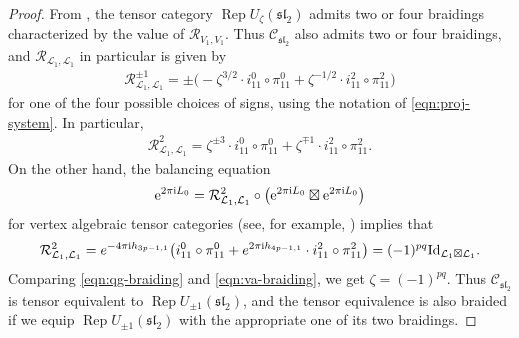 \documentclass[pdftex]{sigma}
\numberwithin{equation}{section}
\theoremstyle{definition}
\begin{document}
\begin{proof}
From \cite[Proposition 6.3]{GaNe}, the tensor category $\operatorname{Rep} U_\zeta(\mathfrak{sl}_2)$ admits two or four braidings characterized by the value of $\mathcal{R}_{V_1,V_1}$.
Thus $\mathcal{C}_{\mathfrak{sl}_2}$ also admits two or four braidings, and $\mathcal{R}_{\mathcal{L}_1,\mathcal{L}_1}$ in particular is given by
\begin{gather*}
\mathcal{R}_{\mathcal{L}_1,\mathcal{L}_1}^{\pm 1} = \pm \bigl(-\zeta^{3/2}\cdot i_{11}^0\circ\pi_{11}^0 +\zeta^{-1/2}\cdot i_{11}^2\circ\pi_{11}^2\bigr)
\end{gather*}
for one of the four possible choices of signs, using the notation of \eqref{eqn:proj-system}. In particular,
\begin{gather}\label{eqn:qg-braiding}
\mathcal{R}_{\mathcal{L}_1,\mathcal{L}_1}^2 =\zeta^{\pm 3}\cdot i_{11}^0\circ\pi_{11}^0 +\zeta^{\mp 1}\cdot i_{11}^2\circ\pi_{11}^2.
\end{gather}
On the other hand, the balancing equation
\begin{gather*}
{\rm e}^{2\pi{\rm i }L_0}=\mathcal{R}^2_{\mathcal{L}_1,\mathcal{L}_1}\circ\bigl({\rm e}^{2\pi{\rm i }L_0}\boxtimes {\rm e}^{2\pi{\rm i }L_0}\bigr)
\end{gather*}
for vertex algebraic tensor categories (see, for example, \cite[Theorem 4.1]{Hu-rigidity}) implies that
\begin{gather}\label{eqn:va-braiding}
\mathcal{R}_{\mathcal{L}_1,\mathcal{L}_1}^2 = e^{-4\pi {\rm i} h_{3p-1,1}}\bigl(i^0_{11}\circ\pi^0_{11}+e^{2\pi {\rm i}h_{4p-1,1}}\cdot i^2_{11}\circ\pi^2_{11}\bigr) = (-1)^{pq}\mathrm{Id}_{\mathcal{L}_1\boxtimes\mathcal{L}_1}.
\end{gather}
Comparing \eqref{eqn:qg-braiding} and \eqref{eqn:va-braiding}, we get $\zeta =(-1)^{pq}$. Thus $\mathcal{C}_{\mathfrak{sl}_2}$ is tensor equivalent to $\operatorname{Rep} U_{\pm 1}(\mathfrak{sl}_2)$, and the tensor equivalence is also braided if we equip $\operatorname{Rep} U_{\pm 1}(\mathfrak{sl}_2)$ with the appropriate one of its two braidings.


\end{proof}
\end{document}
